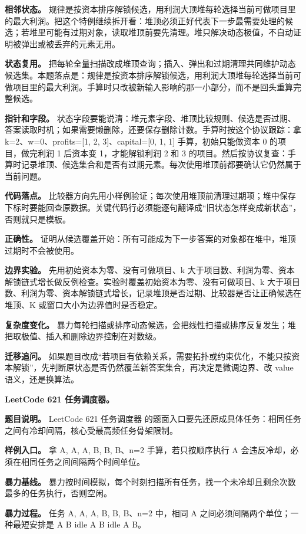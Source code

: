 \textbf{相邻状态。} 规律是按资本排序解锁候选，用利润大顶堆每轮选择当前可做项目里的最大利润。把这个特例继续拆开看：堆顶必须正好代表下一步最需要处理的候选；若堆里可能有过期对象，读取堆顶前要先清理。堆只解决动态极值，不自动证明被弹出或被丢弃的元素无用。

\textbf{状态复用。} 把每轮全量扫描改成堆顶查询；插入、弹出和过期清理共同维护动态候选集。本题落点是：规律是按资本排序解锁候选，用利润大顶堆每轮选择当前可做项目里的最大利润。手算时只改被新输入影响的那一小部分，而不是回头重算完整候选。

\textbf{指针和字段。} 状态字段要能说清：堆元素字段、堆顶比较规则、候选是否过期、答案读取时机；如果需要懒删除，还要保存删除计数。手算时按这个协议跟踪：拿 k=2、w=0、profits=[1, 2, 3]、capital=[0, 1, 1] 手算，初始只能做资本 0 的项目，做完利润 1 后资本变 1，才能解锁利润 2 和 3 的项目。然后按协议复查：手算时记录堆顶、候选集合和是否有过期元素。每次使用堆顶前都要确认它仍然属于当前问题。

\textbf{代码落点。} 比较器方向先用小样例验证；每次使用堆顶前清理过期项；堆中保存下标时要能回查原数据。关键代码行必须能逐句翻译成“旧状态怎样变成新状态”，否则就只是模板。

\textbf{正确性。} 证明从候选覆盖开始：所有可能成为下一步答案的对象都在堆中，堆顶过期时不会被使用。

\textbf{边界实验。} 先用初始资本为零、没有可做项目、k 大于项目数、利润为零、资本解锁链式增长做反例检查。实验时覆盖初始资本为零、没有可做项目、k 大于项目数、利润为零、资本解锁链式增长，记录堆顶是否过期、比较器是否让正确候选在堆顶、K 或窗口大小为边界值时是否稳定。

\textbf{复杂度变化。} 暴力每轮扫描或排序动态候选，会把线性扫描或排序反复发生；堆把取极值、插入和删除边界控制在对数级。

\textbf{迁移追问。} 如果题目改成“若项目有依赖关系，需要拓扑或约束优化，不能只按资本解锁”，先判断原状态是否仍然覆盖新答案集合，再决定是微调边界、改 value 语义，还是换算法。

\noindent\textbf{LeetCode 621 任务调度器。}

\textbf{题目说明。} LeetCode 621 任务调度器 的题面入口要先还原成具体任务：相同任务之间有冷却间隔，核心受最高频任务骨架限制。

\textbf{样例入口。} 拿 A, A, A, B, B, B、n=2 手算，若只按顺序执行 A 会违反冷却，必须在相同任务之间间隔两个时间单位。

\textbf{暴力基线。} 暴力按时间模拟，每个时刻扫描所有任务，找一个未冷却且剩余次数最多的任务执行，否则空闲。

\textbf{暴力过程。} 任务 A, A, A, B, B, B、n=2 中，相同 A 之间必须间隔两个单位；一种最短安排是 A B idle A B idle A B。


